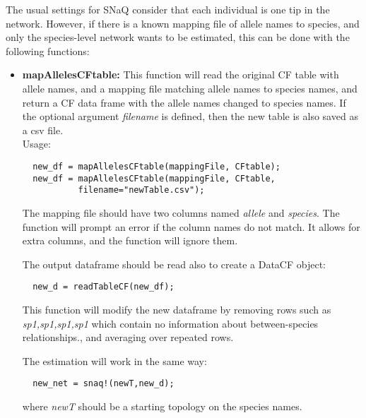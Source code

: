 \documentclass[12pt]{article}
\begin{document}
The usual settings for SNaQ consider that each individual is one tip
in the network. However, if there is a known mapping file of allele
names to species, and only the species-level network wants to be
estimated, this can be done with the following functions:
\begin{itemize}
\item{\textbf{mapAllelesCFtable:} This function will read the original
  CF table with allele names, and a mapping file matching allele names
to species names, and return a CF data frame with the allele names
changed to species names. If the optional argument \textit{filename} is defined,
then the new table is also saved as a csv file.
\\Usage:
\begin{lstlisting}
  new_df = mapAllelesCFtable(mappingFile, CFtable);
  new_df = mapAllelesCFtable(mappingFile, CFtable,
           filename="newTable.csv");
\end{lstlisting}

The mapping file should have two columns named \textit{allele} and
\textit{species}. The function will prompt an error if the column
names do not match. It allows for extra columns, and the function will
ignore them.

The output dataframe should be read also to create a DataCF object:
\begin{lstlisting}
  new_d = readTableCF(new_df);
\end{lstlisting}
This function will modify the new dataframe by removing rows such as
\textit{sp1,sp1,sp1,sp1} which contain no information about
between-species relationships., and averaging over repeated rows.

The estimation will work in the same way:
\begin{lstlisting}
  new_net = snaq!(newT,new_d);
\end{lstlisting}
where \textit{newT} should be a starting topology on the species
names.

}
\end{itemize}
\end{document}
